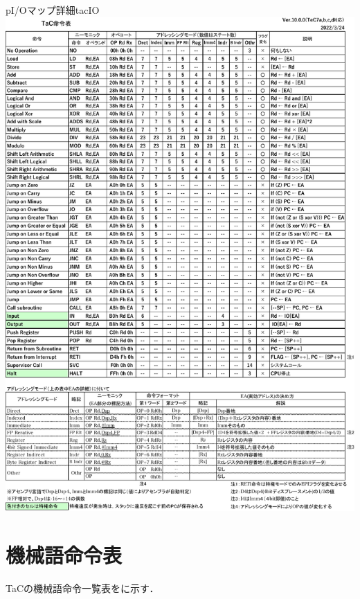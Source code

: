\begin{myfig}{p}{I/Oマップ詳細}{tacIO}
  \includegraphics[scale=0.7,page=5]{Fig/TacInst-crop.pdf}
\end{myfig}

\section{機械語命令表}
TaCの機械語命令一覧表をに示す．

